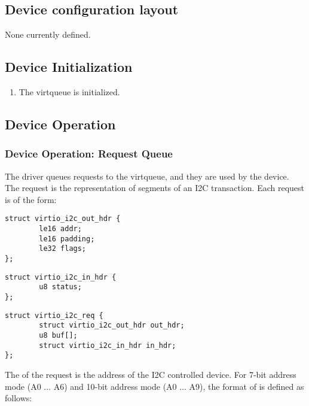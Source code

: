 \subsection{Device configuration layout}\label{sec:Device Types / I2C Adapter Device / Device configuration layout}

None currently defined.

\subsection{Device Initialization}\label{sec:Device Types / I2C Adapter Device / Device Initialization}

\begin{enumerate}
\item The virtqueue is initialized.
\end{enumerate}

\subsection{Device Operation}\label{sec:Device Types / I2C Adapter Device / Device Operation}

\subsubsection{Device Operation: Request Queue}\label{sec:Device Types / I2C Adapter Device / Device Operation: Request Queue}

The driver queues requests to the virtqueue, and they are used by the
device. The request is the representation of segments of an I2C
transaction. Each request is of the form:

\begin{lstlisting}
struct virtio_i2c_out_hdr {
        le16 addr;
        le16 padding;
        le32 flags;
};
\end{lstlisting}

\begin{lstlisting}
struct virtio_i2c_in_hdr {
        u8 status;
};
\end{lstlisting}

\begin{lstlisting}
struct virtio_i2c_req {
        struct virtio_i2c_out_hdr out_hdr;
        u8 buf[];
        struct virtio_i2c_in_hdr in_hdr;
};
\end{lstlisting}

The  of the request is the address of the I2C controlled device.
For 7-bit address mode (A0 ... A6) and 10-bit address mode (A0 ... A9),
the format of  is defined as follows:

